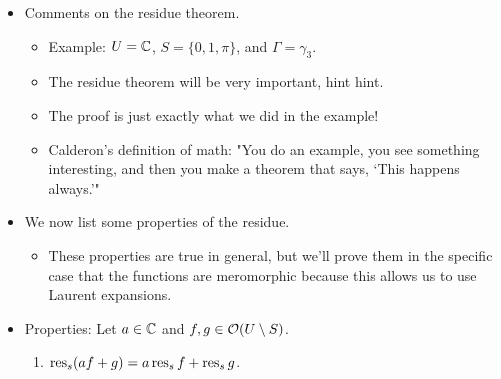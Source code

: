 \documentclass[../notes.tex]{subfiles}
\begin{document}
\begin{itemize}
\begin{proof}
        \begin{equation*}
            \Gamma' := \Gamma-\sum_{s\in S}\wn(\Gamma,s)\gamma_s
        \end{equation*}
        $\Gamma'$ is nulhomologous. Thus, by the CIT,
        \begin{equation*}
            \int_{\Gamma'}f\dd{z} = 0
        \end{equation*}
        Now for all $s\in S$,
        \begin{equation*}
            \wn(\Gamma',s) = \wn(\Gamma,s)-\wn(\Gamma,s)\cdot\underbrace{\wn(\gamma_s,s)}_1 = 0
        \end{equation*}
        Therefore, we have that
        \begin{align*}
            \int_\Gamma f\dd{z} &= \int_{\Gamma'}f\dd{z}+\int_{\sum_{s\in S}\wn(\Gamma,s)\gamma_s}f\dd{z}\\
            &= 0+\sum_{s\in S}\wn(\Gamma,s)\int_{\gamma_s}f\dd{z}\\
            &= 2\pi i\sum\wn(\Gamma,s)\res_sf
        \end{align*}
        as desired.
    \end{proof}
    \item Comments on the residue theorem.
    \begin{itemize}
        \item Example: $U=\mathbb{C}$, $S=\{0,1,\pi\}$, and $\Gamma=\gamma_3$.
        \item The residue theorem will be very important, hint hint.
        \item The proof is just exactly what we did in the example!
        \item Calderon's definition of math: "You do an example, you see something interesting, and then you make a theorem that says, `This happens always.'"
    \end{itemize}
    \item We now list some properties of the residue.
    \begin{itemize}
        \item These properties are true in general, but we'll prove them in the specific case that the functions are meromorphic because this allows us to use Laurent expansions.
    \end{itemize}
    \item Properties: Let $a\in\mathbb{C}$ and $f,g\in\mathcal{O}(U\setminus S)$.
    \begin{enumerate}
        \item $\operatorname{res}_s(af+g)=a\operatorname{res}_sf+\operatorname{res}_sg$.

\end{enumerate}
\end{itemize}
\end{document}
